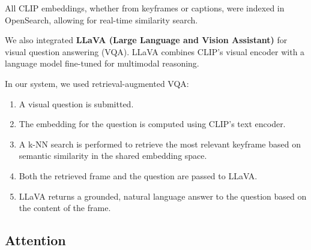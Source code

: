 \documentclass[runningheads]{llncs}
\begin{document}
All CLIP embeddings, whether from keyframes or captions, were indexed in OpenSearch, allowing for real-time similarity search.

We also integrated \textbf{LLaVA (Large Language and Vision Assistant)} for visual question answering (VQA). LLaVA combines CLIP’s visual encoder with a language model fine-tuned for multimodal reasoning.

In our system, we used retrieval-augmented VQA:

\begin{enumerate}
    \item A visual question is submitted.

    \item The embedding for the question is computed using CLIP's text encoder.

    \item A k-NN search is performed to retrieve the most relevant keyframe based on semantic similarity in the shared embedding space.

    \item Both the retrieved frame and the question are passed to LLaVA.

    \item LLaVA returns a grounded, natural language answer to the question based on the content of the frame.
\end{enumerate}

\vspace{2\baselineskip plus 0.5\baselineskip minus 0.5\baselineskip} %

\subsection{Attention}
\end{document}
